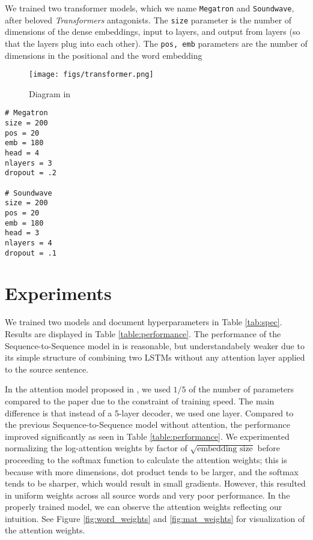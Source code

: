 \documentclass[12pt]{article}
\begin{document}
We trained two transformer models, which we name \texttt{Megatron} and 
\texttt{Soundwave}, after beloved \emph{Transformers} antagonists. The 
\texttt{size} parameter is the number of dimensions of the dense embeddings,
input to layers, and output from layers (so that the layers plug into each
other). The \texttt{pos, emb} parameters are the number of dimensions in the
positional and the word embedding 
\begin{figure}[tb]
	\centering
	\texttt{[image: figs/transformer.png]}
	\caption{Diagram in \cite{vaswani2017attention}}
	\label{fig:transformer}
\end{figure}

\begin{verbatim}
# Megatron
size = 200
pos = 20
emb = 180
head = 4
nlayers = 3
dropout = .2

# Soundwave
size = 200
pos = 20
emb = 180
head = 3
nlayers = 4
dropout = .1
\end{verbatim}

\section{Experiments}
We trained two models and document hyperparameters in Table \ref{tab:spec}. Results are displayed in Table \ref{table:performance}. The performance of the Sequence-to-Sequence model in \cite{sutskever2014sequence} is reasonable, but understandabely weaker due to its simple structure of combining two LSTMs without any attention layer applied to the source sentence.

In the attention model proposed in \cite{bahdanau2014neural}, we used $1/5$ of
the number of parameters compared to the paper due to the constraint of training
speed. The main difference is that instead of a 5-layer decoder, we used one
layer. Compared to the previous Sequence-to-Sequence model without attention,
the performance improved significantly as seen in Table \ref{table:performance}.
We experimented normalizing the log-attention weights by factor of $\sqrt{
\textrm{embedding size}}$ before proceeding to the softmax function to calculate
the attention weights; this is because with more dimensions, dot product tends
to be larger, and the softmax tends to be sharper, which would result in small
gradients. However, this resulted in uniform weights across all source words and
very poor performance. In the properly trained model, we can observe the attention weights reflecting our intuition. See Figure \ref{fig:word_weights} and \ref{fig:mat_weights} for visualization of the attention weights.
\end{document}
